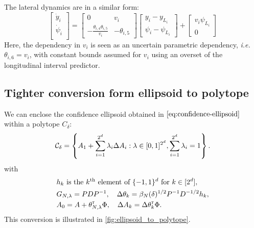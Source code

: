 \documentclass{article}
\begin{document}
The lateral dynamics are in a similar form:
\begin{equation*}
\begin{bmatrix}
\dot{y}_i \\
\dot{\psi}_i \\
\end{bmatrix}
=
\begin{bmatrix}
0 & v_i \\
-\frac{\theta_{i,4} \theta_{i,5}}{v_i} & -\theta_{i,5}
\end{bmatrix}
\begin{bmatrix}
y_i - y_{L_i} \\
\psi_i - \psi_{L_i}
\end{bmatrix}
+
\begin{bmatrix}
v_i\psi_{L_i} \\
0
\end{bmatrix}
\end{equation*}
Here, the dependency in $v_i$ is seen as an uncertain parametric dependency, \emph{i.e.} $\theta_{i,6}=v_i$, with constant bounds assumed for $v_i$ using an overset of the longitudinal interval predictor.

\subsection{Tighter conversion form ellipsoid to polytope}
\label{sec:tight-polytope}
\begin{lemma}
\label{lem:tight_polytope}
We can enclose the confidence ellipsoid obtained in $\eqref{eq:confidence-ellipsoid}$ within a polytope $C_\delta$:
\begin{equation}
     \mathcal{C}_\delta = \left\{ A_{1}+\sum_{i=1}^{2^d}\lambda_{i}\Delta A_{i}: \lambda\in[0, 1]^{2^d},  \sum_{i=1}^{2^d}\lambda_{i}=1\right\}.
\end{equation}
with 
\begin{align*}
    &h_k \text{ is the }k^\text{th}\text{ element of }\{-1,1\}^d\text{ for } k\in[2^d],\\
    &G_{N,\lambda} = PDP^{-1}, \quad \Delta\theta_k = \beta_{N}(\delta)^{1/2} P^{-1}D^{-1/2} h_k, \\
    &A_0 = A + \theta_{N,\lambda}^{\mathsf{\scriptscriptstyle T}}\Phi, \quad \Delta A_k = \Delta\theta_k^{\mathsf{\scriptscriptstyle T}}\Phi.
\end{align*}
This conversion is illustrated in \autoref{fig:ellipsoid_to_polytope}.
\end{lemma}
\end{document}

